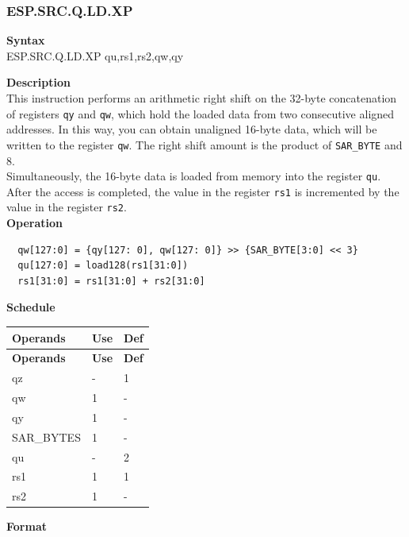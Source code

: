 \newpage
\subsubsection{ESP.SRC.Q.LD.XP}\label{instruction:ESPSRCQLDXP}
\textbf{Syntax}\\
ESP.SRC.Q.LD.XP qu,rs1,rs2,qw,qy

\textbf{Description}\\
This instruction performs an arithmetic right shift on the 32-byte concatenation of registers \lstinline{qy} and \lstinline{qw}, which hold the loaded data from two consecutive aligned addresses. In this way, you can obtain unaligned 16-byte data, which will be written to the register \lstinline{qw}. The right shift amount is the product of \lstinline{SAR_BYTE} and 8.\\
Simultaneously, the 16-byte data is loaded from memory into the register \lstinline{qu}. After the access is completed, the value in the register \lstinline{rs1} is incremented by the value in the register \lstinline{rs2}.\\
\textbf{Operation}
\begin{lstlisting}
  qw[127:0] = {qy[127: 0], qw[127: 0]} >> {SAR_BYTE[3:0] << 3}
  qu[127:0] = load128(rs1[31:0])
  rs1[31:0] = rs1[31:0] + rs2[31:0]
\end{lstlisting}

\textbf{Schedule}\\
\begin{longtable}[c]{|l|l|l|}
    \hline
    \rowcolor{lightgray}
    \textbf{Operands} & \textbf{Use} & \textbf{Def} \\\hline
    \endfirsthead
    \hline
    \rowcolor{lightgray}
     \textbf{Operands} & \textbf{Use} & \textbf{Def} \\\hline
    \endhead
    \hline
    \endfoot

  qz & - & 1 \\\hline
  qw & 1 & - \\\hline
  qy & 1 & - \\\hline
  SAR\_BYTES & 1 & - \\\hline
  qu & - & 2 \\\hline
  rs1 & 1 & 1 \\\hline
  rs2 & 1 & -

\end{longtable}

\textbf{Format}\\


